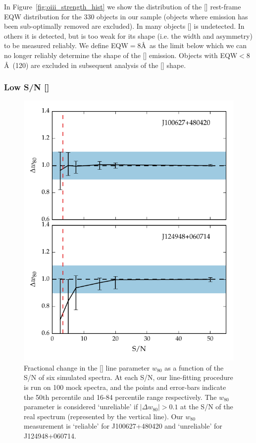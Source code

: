 In Figure~\ref{fig:oiii_strength_hist} we show the distribution of the [] rest-frame \ac{EQW} distribution for the 330 objects in our sample (objects where  emission has been sub-optimally removed are excluded). 
In many objects [] is undetected. 
In others it is detected, but is too weak for its shape (i.e. the width and asymmetry) to be measured reliably. 
We define \ac{EQW}$=8$\AA\, as the limit below which we can no longer reliably determine the shape of the [] emission. 
Objects with \ac{EQW}$<8$\AA\, (120) are excluded in subsequent analysis of the [] shape.  

\subsubsection{Low \ac{S/N} []}
 
\begin{figure}
    \centering
    \includegraphics[width=0.7\columnwidth]{figures/chapter04/snr_test.pdf} 
    \caption{Fractional change in the [] line parameter $w_{80}$ as a function of the \ac{S/N} of six simulated spectra. At each \ac{S/N}, our line-fitting procedure is run on 100 mock spectra, and the points and error-bars indicate the 50th percentile and 16-84 percentile range respectively. The $w_{80}$ parameter is considered `unreliable' if $|\Delta w_{80}|>0.1$ at the \ac{S/N} of the real spectrum (represented by the vertical line). Our $w_{80}$ measurement is `reliable' for J100627+480420 and `unreliable' for J124948+060714.}
    \label{fig:snr_test}
\end{figure}

